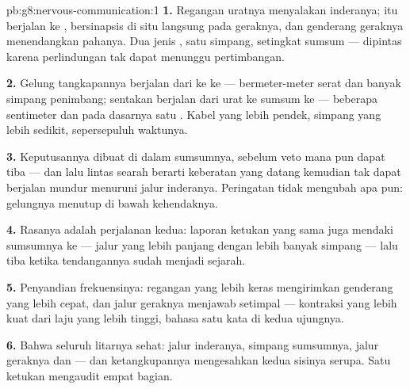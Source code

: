 \begin{solution}{pb:g8:nervous-communication:1}
\textbf{1.} Regangan uratnya menyalakan  inderanya;
 itu berjalan ke \emph{},
bersinapsis di situ langsung pada  geraknya, dan
genderang geraknya menendangkan  pahanya. Dua jenis
, satu simpang, setingkat sumsum ---  dipintas
karena perlindungan tak dapat menunggu pertimbangan.

\textbf{2.} Gelung tangkapannya berjalan dari  ke 
ke  --- bermeter-meter serat dan banyak simpang
penimbang; sentakan  berjalan dari urat ke sumsum ke
 --- beberapa sentimeter dan pada dasarnya satu .
Kabel yang lebih pendek, simpang yang lebih sedikit,
sepersepuluh waktunya.

\textbf{3.} Keputusannya dibuat di dalam sumsumnya, sebelum
veto  mana pun dapat tiba --- dan lalu lintas searah
 berarti keberatan  yang datang kemudian
tak dapat berjalan mundur menuruni jalur inderanya.
Peringatan tidak mengubah apa pun: gelungnya menutup di
bawah kehendaknya.

\textbf{4.} Rasanya adalah perjalanan kedua: laporan ketukan
yang sama juga mendaki sumsumnya ke  --- jalur yang
lebih panjang dengan lebih banyak simpang --- lalu tiba
ketika tendangannya sudah menjadi sejarah.

\textbf{5.} Penyandian frekuensinya: regangan yang lebih
keras mengirimkan genderang yang lebih cepat, dan jalur
geraknya menjawab setimpal --- kontraksi yang lebih kuat
dari laju yang lebih tinggi, bahasa satu kata di kedua
ujungnya.

\textbf{6.} Bahwa seluruh litarnya sehat: jalur inderanya,
simpang sumsumnya, jalur geraknya dan  --- dan
ketangkupannya mengesahkan kedua sisinya serupa. Satu
ketukan mengaudit empat bagian.


\end{solution}
